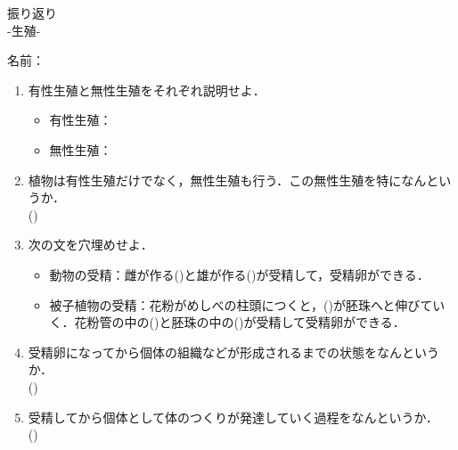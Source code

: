 \documentclass[fontsize=15pt]{jlreq}
\begin{document}
\begin{center}
{\LARGE {振り返り}} \\
-生殖- %
\end{center}
\vspace{1em}
\begin{flushright}
名前：\underline{\hspace{5cm}}
\end{flushright}

\begin{enumerate}

    \item 有性生殖と無性生殖をそれぞれ説明せよ．
    \begin{itemize}
        \item 有性生殖：
        \vspace{1em}
        \item 無性生殖：
    \end{itemize}
    \vspace{2em} 

    \item 植物は有性生殖だけでなく，無性生殖も行う．この無性生殖を特になんというか．\\
    (\hspace{3cm})
    \vspace{2em}

    \item 次の文を穴埋めせよ．
    \begin{itemize}
        \item 動物の受精：雌が作る(\hspace{2cm})と雄が作る(\hspace{2cm})が受精して，受精卵ができる．
        \vspace{1em}
        \item 被子植物の受精：花粉がめしべの柱頭につくと，(\hspace{3cm})が胚珠へと伸びていく．花粉管の中の(\hspace{3cm})と胚珠の中の(\hspace{3cm})が受精して受精卵ができる．
    \end{itemize}
    \vspace{2em} 

    \item 受精卵になってから個体の組織などが形成されるまでの状態をなんというか．\\
    (\hspace{2cm})
    \vspace{2em} 

    \item 受精してから個体として体のつくりが発達していく過程をなんというか．\\
    (\hspace{2cm})
    \vspace{2em}   

\end{enumerate}
\end{document}
